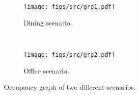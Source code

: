 
    
\begin{figure}[t!]
    \centering
    \begin{subfigure}[t]{\linewidth}
        \centering
        \texttt{[image: figs/src/grp1.pdf]}
        \caption{Dining scenario.}
    \end{subfigure}%
    \\
    \begin{subfigure}[t]{\linewidth}
        \centering
        \texttt{[image: figs/src/grp2.pdf]}
        \caption{Office scenario.}
    \end{subfigure}
    \caption{Occupancy graph of two different scenarios.}\label{fig:occupancy}
\end{figure}